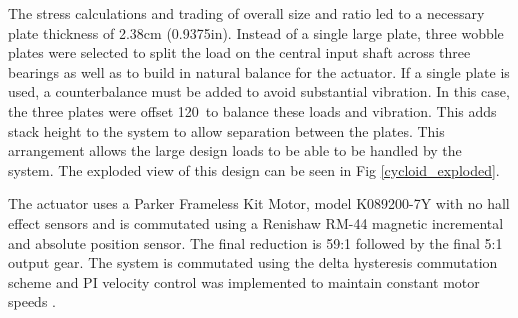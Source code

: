The stress calculations and trading of overall size and ratio led to a necessary plate thickness of 2.38cm (0.9375in).
Instead of a single large plate, three wobble plates were selected to split the load on the central input shaft across three bearings as well as to build in natural balance for the actuator.
If a single plate is used, a counterbalance must be added to avoid substantial vibration.
In this case, the three plates were offset 120\textdegree\ to balance these loads and vibration.
This adds stack height to the system to allow separation between the plates.
This arrangement allows the large design loads to be able to be handled by the system.
The exploded view of this design can be seen in Fig \ref{cycloid_exploded}.

The actuator uses a Parker Frameless Kit Motor, model K089200-7Y with no hall effect sensors and is commutated using a Renishaw RM-44 magnetic incremental and absolute position sensor.
The final reduction is 59:1 followed by the final 5:1 output gear.
The system is commutated using the delta hysteresis commutation scheme and PI velocity control was implemented to maintain constant motor speeds \cite{ref:electric_machines}.

